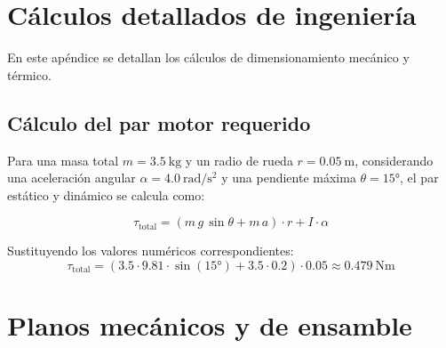 
\appendix

\chapter{Cálculos detallados de ingeniería}
\label{ap:calculos}

En este apéndice se detallan los cálculos de dimensionamiento mecánico y térmico.

\section{Cálculo del par motor requerido}
Para una masa total $m = \qty{3.5}{\kilo\gram}$ y un radio de rueda $r = \qty{0.05}{\meter}$, considerando una aceleración angular $\alpha = \qty{4.0}{\radian\per\second\squared}$ y una pendiente máxima $\theta = \ang{15}$, el par estático y dinámico se calcula como:

\begin{equation}
    \tau_{\text{total}} = (m \, g \, \sin\theta + m \, a) \cdot r + I \cdot \alpha
    \label{eq:par-calculo}
\end{equation}

\noindent Sustituyendo los valores numéricos correspondientes:
\begin{equation}
    \tau_{\text{total}} = (3.5 \cdot 9.81 \cdot \sin(\ang{15}) + 3.5 \cdot 0.2) \cdot 0.05 \approx \qty{0.479}{\newton\meter}
\end{equation}

\chapter{Planos mecánicos y de ensamble}
\label{ap:planos}

